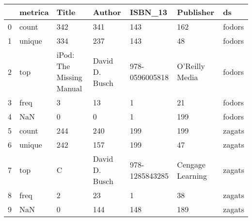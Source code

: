 \begin{tabular}{lllllll}
\toprule
{} & metrica &                     Title &          Author &         ISBN\_13 &         Publisher &      ds \\
\midrule
0 &   count &                       342 &             341 &             143 &               162 &  fodors \\
1 &  unique &                       334 &             237 &             143 &                48 &  fodors \\
2 &     top &  iPod: The Missing Manual &  David D. Busch &  978-0596005818 &    O'Reilly Media &  fodors \\
3 &    freq &                         3 &              13 &               1 &                21 &  fodors \\
4 &     NaN &                         0 &               0 &               1 &               199 &  fodors \\
5 &   count &                       244 &             240 &             199 &               199 &  zagats \\
6 &  unique &                       242 &             157 &             199 &                47 &  zagats \\
7 &     top &                         C &  David D. Busch &  978-1285843285 &  Cengage Learning &  zagats \\
8 &    freq &                         2 &              23 &               1 &                38 &  zagats \\
9 &     NaN &                         0 &             144 &             148 &               189 &  zagats \\
\bottomrule
\end{tabular}

